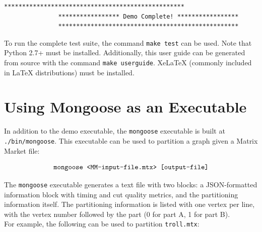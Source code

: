 \documentclass[letter]{article}
\begin{document}
\begin{lstlisting}[numbers=none,xleftmargin=.09\textwidth, xrightmargin=.09\textwidth,keywordstyle=\color{black}]
               **************************************************
               ***************** Demo Complete! *****************
               **************************************************
\end{lstlisting}

To run the complete test suite, the command \texttt{make test} can be used. Note that Python 2.7+ must be installed. Additionally, this user guide can be generated from source with the command \texttt{make userguide}. XeLaTeX (commonly included in LaTeX distributions) must be installed.

\section{Using Mongoose as an Executable}

In addition to the demo executable, the \texttt{mongoose} executable is built at \texttt{./bin/mongoose}. This executable can be used to partition a graph given a Matrix Market file:

\[\text{\texttt{mongoose <MM-input-file.mtx> [output-file]}}\]

The \texttt{mongoose} executable generates a text file with two blocks: a JSON-formatted information block with timing and cut quality metrics, and the partitioning information itself. The partitioning information is listed with one vertex per line, with the vertex number followed by the part (0 for part A, 1 for part B).\\

For example, the following can be used to partition \texttt{troll.mtx}:
\end{document}
